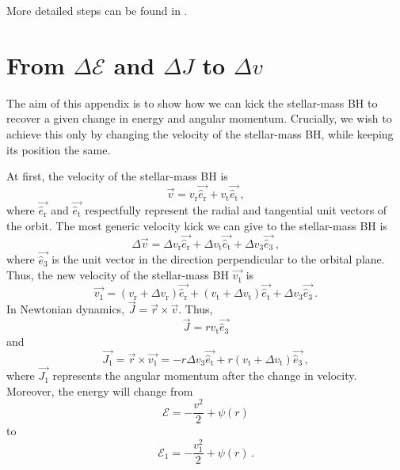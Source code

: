 \documentclass[desactivate]{aa}
\begin{document}
\begin{appendix}
    More detailed steps can be found in \citet{broggi_phd}.

\section{From $\Delta \mathcal{E}$ and $\Delta J$ to $\Delta v$}\label{app:EJtoV}
    The aim of this appendix is to show how we can kick the stellar-mass BH to recover a given change in energy and angular momentum. Crucially, we wish to achieve this only by changing the velocity of the stellar-mass BH, while keeping its position the same.

    At first, the velocity of the stellar-mass BH is
    \begin{equation}
        \vec{v} = v_\mathrm{r} \vec{\hat{e}_\mathrm{r}} + v_\mathrm{t} \vec{\hat{e}_\mathrm{t}} \, ,
    \end{equation}
    where $\vec{\hat{e}_\mathrm{r}}$ and $\vec{\hat{e}_\mathrm{t}}$ respectfully represent the radial and tangential unit vectors of the orbit. The most generic velocity kick we can give to the stellar-mass BH is
    \begin{equation}
        \Delta \vec{v} = \Delta v_\mathrm{r} \vec{\hat{e}_\mathrm{r}} + \Delta v_\mathrm{t} \vec{\hat{e}_\mathrm{t}} +  \Delta v_\mathrm{3} \vec{\hat{e}_\mathrm{3}}\, ,
    \end{equation}
    where $\vec{\hat{e}_\mathrm{3}}$ is the unit vector in the direction perpendicular to the orbital plane. Thus, the new velocity of the stellar-mass BH $\vec{v_1}$ is
    \begin{equation}
        \vec{v_1} = ( v_\mathrm{r} + \Delta v_\mathrm{r} ) \vec{\hat{e}_\mathrm{r}} + ( v_\mathrm{t} + \Delta v_\mathrm{t} ) \vec{\hat{e}_\mathrm{t}} +  \Delta v_\mathrm{3} \vec{\hat{e}_\mathrm{3}} \, .
    \end{equation}
    In Newtonian dynamics, $\vec{J} = \vec{r} \times \vec{v}$. Thus,
    \begin{equation}
        \vec{J} = r v_\mathrm{t} \vec{\hat{e}_\mathrm{3}}
    \end{equation}
    and
    \begin{equation}
        \vec{J_1} = \vec{r} \times \vec{v_1} = -r \Delta v_\mathrm{3} \vec{\hat{e}_\mathrm{t}} + r ( v_\mathrm{t} + \Delta v_\mathrm{t} ) \vec{\hat{e}_\mathrm{3}} \, ,
    \end{equation}
    where $\vec{J_1}$ represents the angular momentum after the change in velocity. Moreover, the energy will change from
    \begin{equation}
        \mathcal{E} = - \frac{v^2}{2} + \psi(r) 
    \end{equation}
    to
    \begin{equation}
        \mathcal{E}_1 = - \frac{v_1^2}{2} + \psi (r) \, .
    \end{equation}
    

\end{appendix}
\end{document}
